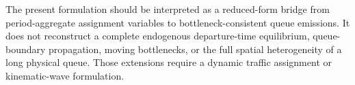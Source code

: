 The present formulation should be interpreted as a reduced-form bridge from
period-aggregate assignment variables to bottleneck-consistent queue
emissions. It does not reconstruct a complete endogenous departure-time
equilibrium, queue-boundary propagation, moving bottlenecks, or the full
spatial heterogeneity of a long physical queue. Those extensions require a
dynamic traffic assignment or kinematic-wave formulation.
